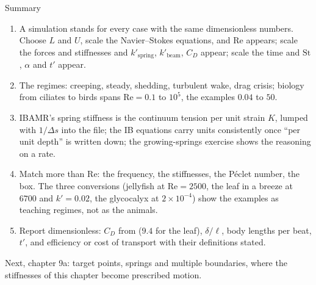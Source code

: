 \documentclass[aspectratio=169,11pt]{beamer}
\begin{document}
\begin{frame}{Summary}
\label{fr:summary}
\footnotesize
\begin{enumerate}
  \item A simulation stands for every case with the same dimensionless numbers. Choose $L$ and $U$, scale the Navier--Stokes equations, and $\mathrm{Re}$ appears; scale the forces and stiffnesses and $k'_{\mathrm{spring}}$, $k'_{\mathrm{beam}}$, $C_D$ appear; scale the time and $\mathrm{St}$, $\alpha$ and $t'$ appear.
  \item The regimes: creeping, steady, shedding, turbulent wake, drag crisis; biology from ciliates to birds spans $\mathrm{Re} = 0.1$ to $10^5$, the examples $0.04$ to $50$.
  \item IBAMR's spring stiffness is the continuum tension per unit strain $K$, lumped with $1/\Delta s$ into the file; the IB equations carry units consistently once ``per unit depth'' is written down; the growing-springs exercise shows the reasoning on a rate.
  \item Match more than $\mathrm{Re}$: the frequency, the stiffnesses, the P\'eclet number, the box. The three conversions (jellyfish at $\mathrm{Re} = 2500$, the leaf in a breeze at $6700$ and $k' = 0.02$, the glycocalyx at $2\times10^{-4}$) show the examples as teaching regimes, not as the animals.
  \item Report dimensionless: $C_D$ from  ($9.4$ for the leaf), $\delta/\ell$, body lengths per beat, $t'$, and efficiency or cost of transport with their definitions stated.
\end{enumerate}
\begin{homebox}
\footnotesize Next, chapter 9a: target points, springs and multiple boundaries, where the stiffnesses of this chapter become prescribed motion.
\end{homebox}
\end{frame}
\end{document}
